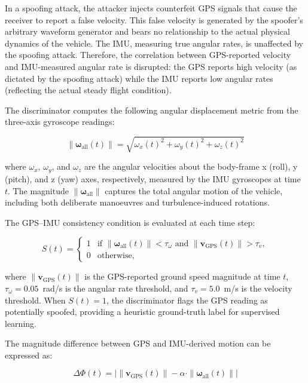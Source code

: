 \documentclass[electronics,article,accept,moreauthors]{Definitions/mdpi}
\begin{document}
In a spoofing attack, the attacker injects counterfeit GPS signals that cause the receiver to report a false velocity. This false velocity is generated by the spoofer's arbitrary waveform generator and bears no relationship to the actual physical dynamics of the vehicle. The IMU, measuring true angular rates, is unaffected by the spoofing attack. Therefore, the correlation between GPS-reported velocity and IMU-measured angular rate is disrupted: the GPS reports high velocity (as dictated by the spoofing attack) while the IMU reports low angular rates (reflecting the actual steady flight condition).

The discriminator computes the following angular displacement metric from the three-axis gyroscope readings:

\begin{equation}
\|\boldsymbol{\omega}_{\text{all}}(t)\| = \sqrt{\omega_x(t)^2 + \omega_y(t)^2 + \omega_z(t)^2}
\label{eq:angularrate}
\end{equation}

where $\omega_x$, $\omega_y$, and $\omega_z$ are the angular velocities about the body-frame x (roll), y (pitch), and z (yaw) axes, respectively, measured by the IMU gyroscopes at time $t$. The magnitude $\|\boldsymbol{\omega}_{\text{all}}\|$ captures the total angular motion of the vehicle, including both deliberate manoeuvres and turbulence-induced rotations.

The GPS--IMU consistency condition is evaluated at each time step:

\begin{equation}
S(t) = \begin{cases}
1 & \text{if } \|\boldsymbol{\omega}_{\text{all}}(t)\| < \tau_\omega \text{ and } \|\mathbf{v}_{\text{GPS}}(t)\| > \tau_v, \\
0 & \text{otherwise},
\end{cases}
\label{eq:spoofindicator}
\end{equation}

where $\|\mathbf{v}_{\text{GPS}}(t)\|$ is the GPS-reported ground speed magnitude at time $t$, $\tau_\omega = 0.05$~rad/s is the angular rate threshold, and $\tau_v = 5.0$~m/s is the velocity threshold. When $S(t) = 1$, the discriminator flags the GPS reading as potentially spoofed, providing a heuristic ground-truth label for supervised learning.

The magnitude difference between GPS and IMU-derived motion can be expressed as:

\begin{equation}
\Delta\Phi(t) = \left| \|\mathbf{v}_{\text{GPS}}(t)\| - \alpha \cdot \|\boldsymbol{\omega}_{\text{all}}(t)\| \right|
\label{eq:deltaphi}
\end{equation}
\end{document}
